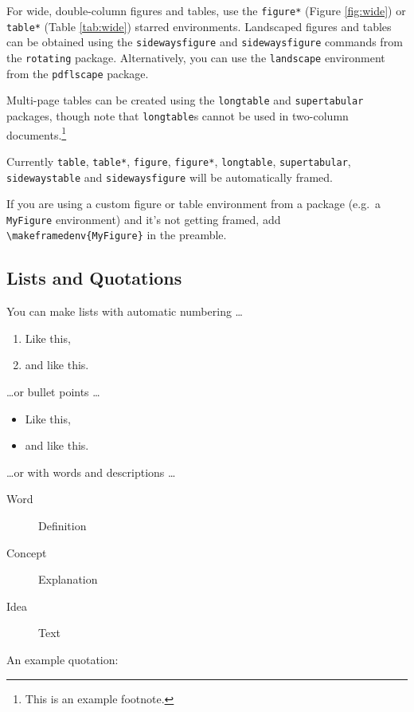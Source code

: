 \documentclass[bibtex,autowc]{apsr_submission}
\begin{document}
For wide, double-column figures and tables, use the \verb|figure*| (Figure \ref{fig:wide}) or \verb|table*| (Table \ref{tab:wide}) starred environments. Landscaped figures and tables can be obtained using the \texttt{sidewaysfigure} and \texttt{sidewaysfigure} commands from the \texttt{rotating} package. Alternatively, you can use the \texttt{landscape} environment from the \texttt{pdflscape} package.

Multi-page tables can be created using the \texttt{longtable} and \texttt{supertabular} packages, though note that \texttt{longtable}s cannot be used in two-column documents.\footnote{This is an example footnote. \lipsum[1]}


Currently \texttt{table}, \texttt{table*}, \texttt{figure}, \texttt{figure*}, \texttt{longtable}, \texttt{supertabular}, \texttt{sidewaystable} and \texttt{sidewaysfigure} will be automatically framed.

If you are using a custom figure or table environment from a package (e.g.~a \texttt{MyFigure} environment) and it's not getting framed, add \verb|\makeframedenv{MyFigure}| in the preamble. 

\subsection{Lists and Quotations}

You can make lists with automatic numbering \dots

\begin{enumerate}
\item Like this,
\item and like this.
\end{enumerate}

\dots or bullet points \dots

\begin{itemize} 
\item Like this,
\item and like this.
\end{itemize}

\dots or with words and descriptions \dots

\begin{description}
\item[Word] Definition
\item[Concept] Explanation
\item[Idea] Text
\end{description}

An example quotation:
\end{document}
